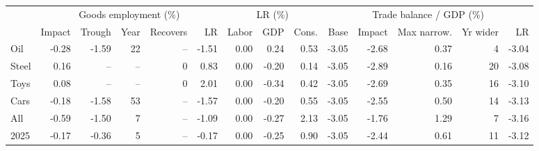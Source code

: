 \begin{tabular}{lrrrrrrrrrrrrr}
\toprule
 & \multicolumn{5}{c}{Goods employment (\%)} & \multicolumn{3}{c}{LR (\%)} & \multicolumn{5}{c}{Trade balance / GDP (\%)} \\
\cmidrule(lr){2-6}\cmidrule(lr){7-9}\cmidrule(lr){10-14}
 & Impact & Trough & Year & Recovers & LR & Labor & GDP & Cons. & Base & Impact & Max narrow. & Yr wider & LR \\
\midrule
Oil & -0.28 & -1.59 & 22 & -- & -1.51 & 0.00 & 0.24 & 0.53 & -3.05 & -2.68 & 0.37 & 4 & -3.04 \\
Steel & 0.16 & -- & -- & 0 & 0.83 & 0.00 & -0.20 & 0.14 & -3.05 & -2.89 & 0.16 & 20 & -3.08 \\
Toys & 0.08 & -- & -- & 0 & 2.01 & 0.00 & -0.34 & 0.42 & -3.05 & -2.69 & 0.35 & 16 & -3.10 \\
Cars & -0.18 & -1.58 & 53 & -- & -1.57 & 0.00 & -0.20 & 0.55 & -3.05 & -2.55 & 0.50 & 14 & -3.13 \\
All & -0.59 & -1.50 & 7 & -- & -1.09 & 0.00 & -0.27 & 2.13 & -3.05 & -1.76 & 1.29 & 7 & -3.16 \\
2025 & -0.17 & -0.36 & 5 & -- & -0.17 & 0.00 & -0.25 & 0.90 & -3.05 & -2.44 & 0.61 & 11 & -3.12 \\
\bottomrule
\end{tabular}
